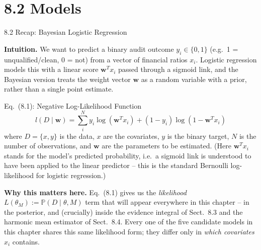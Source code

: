 \documentclass[aspectratio=169,10pt]{beamer}
\begin{document}
\section{8.2 Models}

\begin{frame}[allowframebreaks]{8.2 Recap: Bayesian Logistic Regression}

\textbf{Intuition.} We want to predict a binary audit outcome $y_i \in \{0,1\}$ (e.g.\ 1 = unqualified/clean, 0 = not) from a vector of financial ratios $x_i$. Logistic regression models this with a linear score $\mathbf{w}^T x_i$ passed through a sigmoid link, and the Bayesian version treats the weight vector $\mathbf{w}$ as a random variable with a prior, rather than a single point estimate.

\begin{block}{Eq.\ (8.1): Negative Log-Likelihood Function}
\[
l(D \mid \mathbf{w}) = \sum_{i}^{N} y_i \log(\mathbf{w}^T x_i) + (1 - y_i)\log(1 - \mathbf{w}^T x_i)
\]
where $D = \{x, y\}$ is the data, $x$ are the covariates, $y$ is the binary target, $N$ is the number of observations, and $\mathbf{w}$ are the parameters to be estimated. (Here $\mathbf{w}^T x_i$ stands for the model's predicted probability, i.e.\ a sigmoid link is understood to have been applied to the linear predictor -- this is the standard Bernoulli log-likelihood for logistic regression.)
\end{block}

\framebreak

\textbf{Why this matters here.} Eq.\ (8.1) gives us the \emph{likelihood} $L(\theta_M) := \mathbb{P}(D \mid \theta, M)$ term that will appear everywhere in this chapter -- in the posterior, and (crucially) inside the evidence integral of Sect.\ 8.3 and the harmonic mean estimator of Sect.\ 8.4. Every one of the five candidate models in this chapter shares this same likelihood form; they differ only in \emph{which covariates} $x_i$ contains.

\end{frame}
\end{document}
